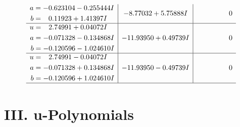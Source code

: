 \documentclass[1p]{elsarticle_modified}
\theoremstyle{definition}
\begin{document}
$$\begin{array}{c|c|c}
\begin{aligned}
a &= -0.623104 - 0.255444 I \\
b &= \phantom{-}0.11923 + 1.41397 I\end{aligned}
 & -8.77032 + 5.75888 I & \phantom{-0.000000 } 0 \\ \hline\begin{aligned}
u &= \phantom{-}2.74991 + 0.04072 I \\
a &= -0.071328 - 0.134868 I \\
b &= -0.120596 - 1.024610 I\end{aligned}
 & -11.93950 + 0.49739 I & \phantom{-0.000000 } 0 \\ \hline\begin{aligned}
u &= \phantom{-}2.74991 - 0.04072 I \\
a &= -0.071328 + 0.134868 I \\
b &= -0.120596 + 1.024610 I\end{aligned}
 & -11.93950 - 0.49739 I & \phantom{-0.000000 } 0\\
 \hline 
 \end{array}$$\newpage
\newpage\renewcommand{\arraystretch}{1}
\centering \section*{ III. u-Polynomials}
\end{document}
